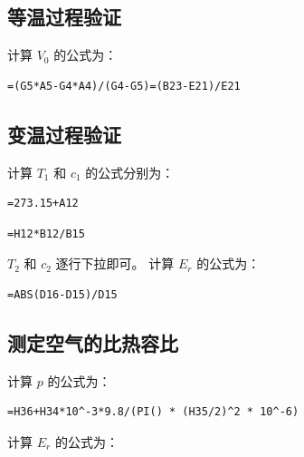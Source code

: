 \documentclass[12pt]{article}
\begin{document}
\subsection{\normalfont 等温过程验证}

计算 $V_0$ 的公式为：
\begin{Verbatim}[frame=single]
    =(G5*A5-G4*A4)/(G4-G5)=(B23-E21)/E21
\end{Verbatim}

\subsection{\normalfont 变温过程验证}

计算 $T_1$ 和 $c_1$ 的公式分别为：
\begin{Verbatim}[frame=single]
    =273.15+A12
\end{Verbatim}
\begin{Verbatim}[frame=single]
    =H12*B12/B15
\end{Verbatim}
$T_2$ 和 $c_2$ 逐行下拉即可。\newline 
\newline 计算 $E_r$ 的公式为：
\begin{Verbatim}[frame=single]
    =ABS(D16-D15)/D15
\end{Verbatim}

\subsection{\normalfont 测定空气的比热容比}

计算 $p$ 的公式为：
\begin{Verbatim}[frame=single]
    =H36+H34*10^-3*9.8/(PI() * (H35/2)^2 * 10^-6)
\end{Verbatim}
计算 $E_r$ 的公式为：
\end{document}
